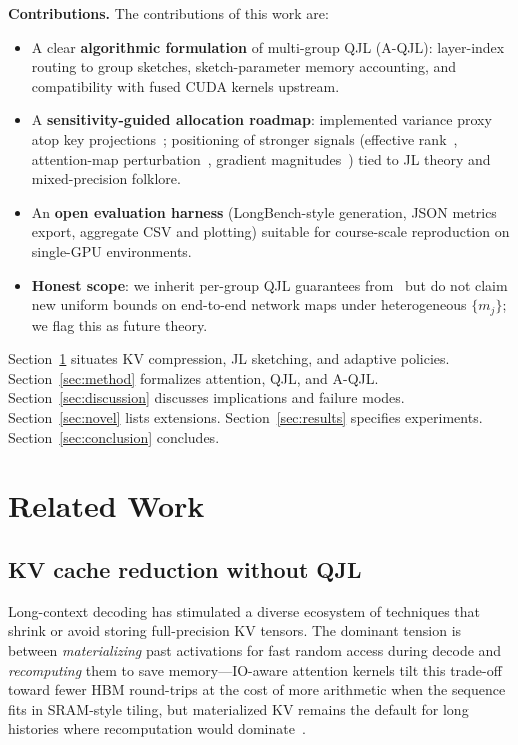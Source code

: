 \documentclass[conference]{IEEEtran}
\begin{document}
\textbf{Contributions.}
The contributions of this work are:
\begin{itemize}
\item A clear \textbf{algorithmic formulation} of multi-group QJL (A-QJL): layer-index routing to group sketches, sketch-parameter memory accounting, and compatibility with fused CUDA kernels upstream.
\item A \textbf{sensitivity-guided allocation roadmap}: implemented variance proxy atop key projections~\cite{zandieh2024aqjl-repo}; positioning of stronger signals (effective rank~\cite{rudelson2014}, attention-map perturbation~\cite{vitspec2021}, gradient magnitudes~\cite{fpguide2018}) tied to JL theory and mixed-precision folklore.
\item An \textbf{open evaluation harness} (LongBench-style generation, JSON metrics export, aggregate CSV and plotting) suitable for course-scale reproduction on single-GPU environments.
\item \textbf{Honest scope}: we inherit per-group QJL guarantees from~\cite{zandieh2024qjl} but do not claim new uniform bounds on end-to-end network maps under heterogeneous $\{m_j\}$; we flag this as future theory.
\end{itemize}

\noindent
Section~\ref{sec:related} situates KV compression, JL sketching, and adaptive policies. Section~\ref{sec:method} formalizes attention, QJL, and A-QJL. Section~\ref{sec:discussion} discusses implications and failure modes. Section~\ref{sec:novel} lists extensions. Section~\ref{sec:results} specifies experiments. Section~\ref{sec:conclusion} concludes.

\section{Related Work}
\label{sec:related}

\subsection{KV cache reduction without QJL}

Long-context decoding has stimulated a diverse ecosystem of techniques that shrink or avoid storing full-precision KV tensors. The dominant tension is between \emph{materializing} past activations for fast random access during decode and \emph{recomputing} them to save memory---IO-aware attention kernels tilt this trade-off toward fewer HBM round-trips at the cost of more arithmetic when the sequence fits in SRAM-style tiling, but materialized KV remains the default for long histories where recomputation would dominate~\cite{zandieh2024qjl,touvron2023llama}.
\end{document}
